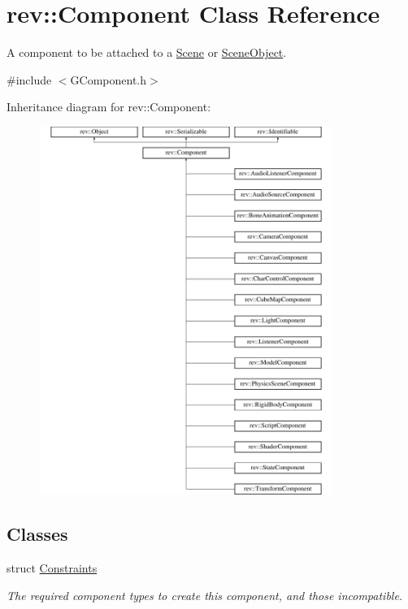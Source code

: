 \hypertarget{classrev_1_1_component}{}\section{rev\+::Component Class Reference}
\label{classrev_1_1_component}


A component to be attached to a \mbox{\hyperlink{classrev_1_1_scene}{Scene}} or \mbox{\hyperlink{classrev_1_1_scene_object}{Scene\+Object}}.  




{\ttfamily \#include $<$G\+Component.\+h$>$}

Inheritance diagram for rev\+::Component\+:\begin{figure}[H]
\begin{center}
\leavevmode
\includegraphics[height=12.000000cm]{classrev_1_1_component}
\end{center}
\end{figure}
\subsection*{Classes}
\begin{DoxyCompactItemize}
\item 
struct \mbox{\hyperlink{structrev_1_1_component_1_1_constraints}{Constraints}}
\begin{DoxyCompactList}\small\item\em The required component types to create this component, and those incompatible. \end{DoxyCompactList}\end{DoxyCompactItemize}
